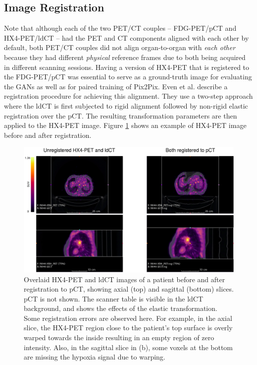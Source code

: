 \subsection{Image Registration}
Note that although each of the two PET/CT couples -- FDG-PET/pCT and HX4-PET/ldCT -- had the PET and CT components aligned with each other by default, both PET/CT couples did not align organ-to-organ with \textit{each other} because they had different \textit{physical} reference frames due to both being acquired in different scanning sessions. Having a version of HX4-PET that is registered to the FDG-PET/pCT was essential to serve as a ground-truth image for evaluating the GANs as well as for paired training of Pix2Pix. Even et al. \cite{even2017predicting} describe a registration procedure for achieving this alignment. They use a two-step approach where the ldCT is first subjected to rigid alignment followed by non-rigid elastic registration over the pCT. The resulting transformation parameters are then applied to the HX4-PET image. Figure \ref{fig:reg_images} shows an example of HX4-PET image before and after registration. 

\begin{figure}[h!]
    \centering
    \includegraphics[width=\linewidth]{figures/Data/reg/N046-HX4_PET_ldCT-unreg_reg.png}
    \caption{Overlaid HX4-PET and ldCT images of a patient before and after registration to pCT, showing axial (top) and sagittal (bottom) slices. pCT is not shown. The scanner table is visible in the ldCT background, and shows the effects of the elastic transformation. Some registration errors are observed here. For example, in the axial slice, the HX4-PET region close to the patient's top surface is overly warped towards the inside resulting in an empty region of zero intensity. Also, in the sagittal slice in (b), some voxels at the bottom are missing the hypoxia signal due to warping.}
    \label{fig:reg_images}
\end{figure}{}

